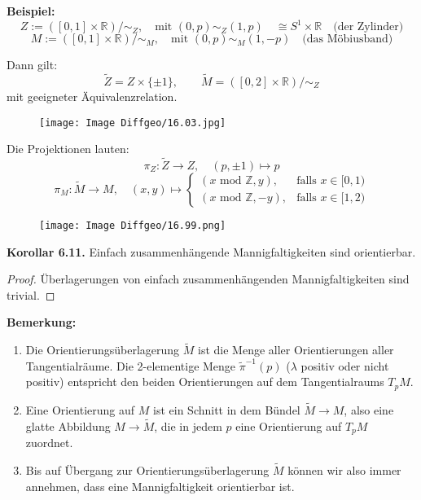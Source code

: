 \documentclass[fleqn, 12pt, letterpaper]{article}
\begin{document}
\textbf{Beispiel:}
\[
Z := ([0,1] \times \mathbb{R}) /\sim_Z, \quad \text{mit } (0,p) \sim_Z (1,p) \quad \cong S^1 \times \mathbb{R} \quad \text{(der Zylinder)}
\]
\[
M := ([0,1] \times \mathbb{R}) / \sim_M, \quad \text{mit } (0,p) \sim_M (1, -p) \quad \text{(das Möbiusband)}
\]

Dann gilt:
\[
\widetilde{Z} = Z \times \{\pm 1\}, \qquad 
\widetilde{M} = ([0,2] \times \mathbb{R}) / \sim_Z
\]
mit geeigneter Äquivalenzrelation.
  \begin{figure}[H]
    \centering
    \texttt{[image: Image Diffgeo/16.03.jpg]}
 \end{figure}

Die Projektionen lauten:
\[
\pi_Z : \widetilde{Z} \to Z, \quad (p, \pm 1) \mapsto p
\]
\[
\pi_M : \widetilde{M} \to M, \quad (x,y) \mapsto
\begin{cases}
(x\text{ mod }\mathbb{Z}, y), & \text{falls } x \in [0,1) \\
(x\text{ mod }\mathbb{Z}, -y), & \text{falls } x \in [1,2)
\end{cases}
\]
  \begin{figure}[H]
    \centering
    \texttt{[image: Image Diffgeo/16.99.png]}
 \end{figure}
\textbf{Korollar 6.11.}  
Einfach zusammenhängende Mannigfaltigkeiten sind orientierbar.

\begin{proof}
Überlagerungen von einfach zusammenhängenden Mannigfaltigkeiten sind trivial.
\end{proof}

\vspace{1em}
\textbf{Bemerkung:}
\begin{enumerate}[label=\roman*)]
    \item Die Orientierungsüberlagerung \( \widetilde{M} \) ist die Menge aller Orientierungen aller Tangentialräume.  
    Die 2-elementige Menge \( \tilde{\pi}^{-1}(p) \) ($\lambda$ positiv oder nicht positiv) entspricht den beiden Orientierungen auf dem Tangentialraums \( T_p M \).

    \item Eine Orientierung auf \( M \) ist ein Schnitt in dem Bündel \( \widetilde{M} \to M \),  
    also eine glatte Abbildung \( M \to \widetilde{M} \), die in jedem \( p \) eine Orientierung auf \( T_p M \) zuordnet.

    \item Bis auf Übergang zur Orientierungsüberlagerung \( \widetilde{M} \)  
    können wir also immer annehmen, dass eine Mannigfaltigkeit orientierbar ist.
\end{enumerate}
\end{document}
